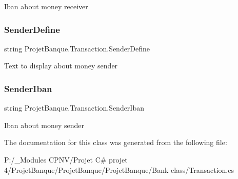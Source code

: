 Iban about money receiver 

\mbox{\label{class_projet_banque_1_1_transaction_a03b93454caad64a6f271df40a88bb585}} 
\subsubsection{\texorpdfstring{SenderDefine}{SenderDefine}}
{\footnotesize\ttfamily string Projet\+Banque.\+Transaction.\+Sender\+Define\hspace{0.3cm}{\ttfamily [get]}}



Text to display about money sender 

\mbox{\label{class_projet_banque_1_1_transaction_a227080527c4fc0cd4cb37f15cf5f505e}} 
\subsubsection{\texorpdfstring{SenderIban}{SenderIban}}
{\footnotesize\ttfamily string Projet\+Banque.\+Transaction.\+Sender\+Iban\hspace{0.3cm}{\ttfamily [get]}}



Iban about money sender 



The documentation for this class was generated from the following file\+:\begin{DoxyCompactItemize}
\item 
P\+:/\+\_\+\+Modules C\+P\+N\+V/\+Projet C\# projet 4/\+Projet\+Banque/\+Projet\+Banque/\+Projet\+Banque/\+Bank class/Transaction.\+cs\end{DoxyCompactItemize}
